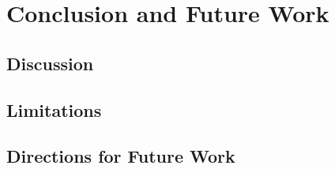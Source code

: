 \chapter{\label{ch:6-conclusion}Conclusion and Future Work} 

\minitoc

\section{Discussion}

\section{Limitations}

\section{Directions for Future Work}